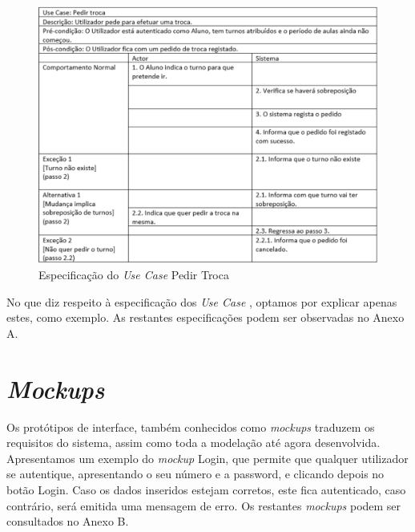 \documentclass[12pt,a4paper]{report}
\begin{document}
\begin{figure}[H]
	\centering 
	\includegraphics[width=\textwidth]{modelacao/especificacao_use_case/PedirTroca.png}  
	\caption{Especificação do \emph{Use Case} Pedir Troca}
\end{figure}


No que diz respeito à especificação dos \emph{Use Case} , optamos por explicar apenas estes, como exemplo. As restantes especificações  podem ser observadas no Anexo A.


\chapter {\emph{Mockups}}
Os protótipos de interface, também conhecidos como \emph{mockups} traduzem os requisitos do sistema, assim como toda a modelação até agora desenvolvida. 
Apresentamos um exemplo do \emph{mockup} Login, que permite que qualquer utilizador se autentique, apresentando o seu número e a password, e clicando depois no botão Login. Caso os dados inseridos estejam corretos, este fica autenticado, caso contrário, será emitida uma mensagem de erro.
Os restantes \emph{mockups} podem ser consultados no Anexo B.
\end{document}
